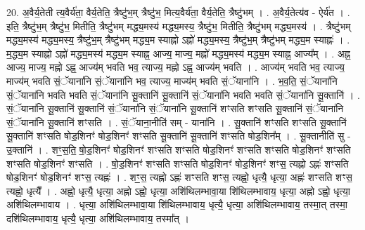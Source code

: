 \documentclass[17pt]{extarticle}
\begin{document}
20. अ॒वैर्य॒तेती त्य॒वैर्य॑ता॒ वैर्य॒तेति॒ त्रैष्टु॑भ॒म् त्रैष्टु॑भ॒ मित्य॒वैर्य॑ता॒ वैर्य॒तेति॒ त्रैष्टु॑भम् । . अ॒वैर्य॒तेत्य॑व - ऐर्य॑त । . इति॒ त्रैष्टु॑भ॒म् त्रैष्टु॑भ॒ मितीति॒ त्रैष्टु॑भम् मद्ध्य॒मस्य॑ मद्ध्य॒मस्य॒ त्रैष्टु॑भ॒ मितीति॒ त्रैष्टु॑भम् मद्ध्य॒मस्य॑ । . त्रैष्टु॑भम् मद्ध्य॒मस्य॑ मद्ध्य॒मस्य॒ त्रैष्टु॑भ॒म् त्रैष्टु॑भम् मद्ध्य॒म स्याह्नो ऽह्नो॑ मद्ध्य॒मस्य॒ त्रैष्टु॑भ॒म् त्रैष्टु॑भम् मद्ध्य॒म स्याह्नः॑ । . म॒द्ध्य॒म स्याह्नो ऽह्नो॑ मद्ध्य॒मस्य॑ मद्ध्य॒म स्याह्न॒ आज्य॒ माज्य॒ मह्नो॑ मद्ध्य॒मस्य॑ मद्ध्य॒म स्याह्न॒ आज्य᳚म् । . अह्न॒ आज्य॒ माज्य॒ मह्नो ऽह्न॒ आज्य॑म् भवति भव॒ त्याज्य॒ मह्नो ऽह्न॒ आज्य॑म् भवति । . आज्य॑म् भवति भव॒ त्याज्य॒ माज्य॑म् भवति सं॒ॅयाना॑नि सं॒ॅयाना॑नि भव॒ त्याज्य॒ माज्य॑म् भवति सं॒ॅयाना॑नि । . भ॒व॒ति॒ सं॒ॅयाना॑नि सं॒ॅयाना॑नि भवति भवति सं॒ॅयाना॑नि सू॒क्तानि॑ सू॒क्तानि॑ सं॒ॅयाना॑नि भवति भवति सं॒ॅयाना॑नि सू॒क्तानि॑ । . सं॒ॅयाना॑नि सू॒क्तानि॑ सू॒क्तानि॑ सं॒ॅयाना॑नि सं॒ॅयाना॑नि सू॒क्तानि॑ शꣳसति शꣳसति सू॒क्तानि॑ सं॒ॅयाना॑नि सं॒ॅयाना॑नि सू॒क्तानि॑ शꣳसति । . सं॒ॅयाना॒नीति॑ सम् - याना॑नि । . सू॒क्तानि॑ शꣳसति शꣳसति सू॒क्तानि॑ सू॒क्तानि॑ शꣳसति षोड॒शिनꣳ॑ षोड॒शिनꣳ॑ शꣳसति सू॒क्तानि॑ सू॒क्तानि॑ शꣳसति षोड॒शिन᳚म् । . सू॒क्तानीति॑ सु - उ॒क्तानि॑ । . शꣳ॒॒स॒ति॒ षो॒ड॒शिनꣳ॑ षोड॒शिनꣳ॑ शꣳसति शꣳसति षोड॒शिनꣳ॑ शꣳसति शꣳसति षोड॒शिनꣳ॑ शꣳसति शꣳसति षोड॒शिनꣳ॑ शꣳसति । . षो॒ड॒शिनꣳ॑ शꣳसति शꣳसति षोड॒शिनꣳ॑ षोड॒शिनꣳ॑ शꣳस॒ त्यह्नो ऽह्नः॑ शꣳसति षोड॒शिनꣳ॑ षोड॒शिनꣳ॑ शꣳस॒ त्यह्नः॑ । . शꣳ॒॒स॒ त्यह्नो ऽह्नः॑ शꣳसति शꣳस॒ त्यह्नो॒ धृत्यै॒ धृत्या॒ अह्नः॑ शꣳसति शꣳस॒ त्यह्नो॒ धृत्यै᳚ । . अह्नो॒ धृत्यै॒ धृत्या॒ अह्नो ऽह्नो॒ धृत्या॒ अशि॑थिलम्भावा॒या शि॑थिलम्भावाय॒ धृत्या॒ अह्नो ऽह्नो॒ धृत्या॒ अशि॑थिलम्भावाय । . धृत्या॒ अशि॑थिलम्भावा॒या शि॑थिलम्भावाय॒ धृत्यै॒ धृत्या॒ अशि॑थिलम्भावाय॒ तस्मा॒त् तस्मा॒ दशि॑थिलम्भावाय॒ धृत्यै॒ धृत्या॒ अशि॑थिलम्भावाय॒ तस्मा᳚त् । \newline
\end{document}
